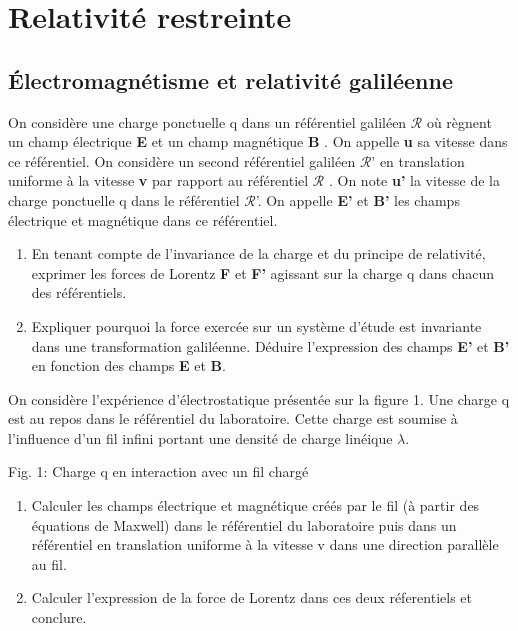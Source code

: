 \chapter{Relativité restreinte}
\section{Électromagnétisme et relativité galiléenne}

On considère une charge ponctuelle q dans un référentiel galiléen $\mathcal{R}$ où règnent un champ
électrique {\bf E} et un champ magnétique {\bf B} . On appelle {\bf u} sa vitesse dans ce référentiel.
On considère un second référentiel galiléen $\mathcal{R}$' en translation uniforme à la vitesse {\bf v} par rapport
au référentiel $\mathcal{R}$ . On note {\bf u'} la vitesse de la charge ponctuelle q dans le référentiel $\mathcal{R}$'. On appelle
{\bf E'} et {\bf B'} les champs électrique et magnétique dans ce référentiel.
\begin{enumerate}
  \item En tenant compte de l'invariance de la charge et du principe de relativité, exprimer les
forces de Lorentz {\bf F} et {\bf F'} agissant sur la charge q dans chacun des référentiels.
  \item Expliquer pourquoi la force exercée sur un système d'étude est invariante dans une transformation galiléenne. Déduire l'expression des champs {\bf E'} et {\bf B'} en fonction des champs {\bf E}
et {\bf B}.
\setcounter{numero}{\theenumi}\end{enumerate}
On considère l'expérience d'électrostatique présentée sur la figure 1. Une charge q est au repos
dans le référentiel du laboratoire. Cette charge est soumise à l'influence d'un fil infini portant
une densité de charge linéique $\lambda$.

\begin{center}
\vspace{0.3cm}

\vspace{0.3cm}
Fig. 1: Charge q en interaction avec un fil chargé
\end{center}
\begin{enumerate}
\setcounter{enumi}{\thenumero} 
  \item Calculer les champs électrique et magnétique créés par le fil (à partir des équations de
Maxwell) dans le référentiel du laboratoire puis dans un référentiel en translation uniforme
à la vitesse v dans une direction parallèle au fil.
  \item Calculer l'expression de la force de Lorentz dans ces deux réferentiels et conclure.
\end{enumerate}

